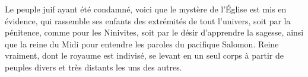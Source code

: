 Le peuple juif ayant été condamné,
	voici que le mystère de l’Église est mis en évidence,
	qui rassemble ses enfants des extrémités de tout l’univers,
	soit par la pénitence, comme pour les Ninivites,
	soit par le désir d’apprendre la sagesse,
	ainsi que la reine du Midi pour entendre les paroles du pacifique Salomon.
Reine vraiment, dont le royaume est indivisé,
	se levant en un seul corps à partir de peuples divers
		et très distants les uns des autres.
